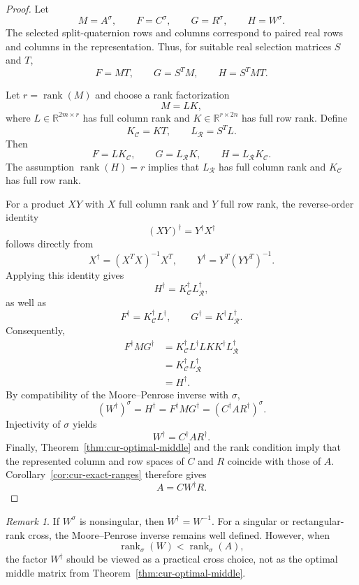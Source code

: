 \documentclass[12pt,a4paper]{article}
\theoremstyle{plain}
\theoremstyle{definition}
\theoremstyle{remark}
\newtheorem{remark}[theorem]{Remark}
\begin{document}
\begin{proof}
Let
\[
    M=A^\sigma, \qquad F=C^\sigma, \qquad G=R^\sigma, \qquad H=W^\sigma.
\]
The selected split-quaternion rows and columns correspond to paired real rows and columns in the representation.  Thus, for suitable real selection matrices \(S\) and \(T\),
\[
    F=MT,\qquad G=S^T M,\qquad H=S^TMT.
\]

Let \(r=\operatorname{rank}(M)\) and choose a rank factorization
\[
    M=LK,
\]
where \(L\in\mathbb{R}^{2m\times r}\) has full column rank and \(K\in\mathbb{R}^{r\times 2n}\) has full row rank.  Define
\[
    K_{\mathcal C}=KT, \qquad L_{\mathcal R}=S^TL.
\]
Then
\[
    F=LK_{\mathcal C}, \qquad G=L_{\mathcal R}K, \qquad H=L_{\mathcal R}K_{\mathcal C}.
\]
The assumption \(\operatorname{rank}(H)=r\) implies that \(L_{\mathcal R}\) has full column rank and \(K_{\mathcal C}\) has full row rank.

For a product \(XY\) with \(X\) full column rank and \(Y\) full row rank, the reverse-order identity
\[
    (XY)^\dagger=Y^\dagger X^\dagger
\]
follows directly from
\[
    X^\dagger=(X^TX)^{-1}X^T, \qquad Y^\dagger=Y^T(YY^T)^{-1}.
\]
Applying this identity gives
\[
    H^\dagger = K_{\mathcal C}^\dagger L_{\mathcal R}^\dagger,
\]
as well as
\[
    F^\dagger=K_{\mathcal C}^\dagger L^\dagger, \qquad G^\dagger=K^\dagger L_{\mathcal R}^\dagger.
\]
Consequently,
\[
\begin{aligned}
    F^\dagger M G^\dagger
    &= K_{\mathcal C}^\dagger L^\dagger L K K^\dagger L_{\mathcal R}^\dagger\\
    &= K_{\mathcal C}^\dagger L_{\mathcal R}^\dagger\\
    &= H^\dagger.
\end{aligned}
\]
By compatibility of the Moore--Penrose inverse with \(\sigma\),
\[
    (W^\dagger)^\sigma = H^\dagger = F^\dagger M G^\dagger = (C^\dagger A R^\dagger)^\sigma.
\]
Injectivity of \(\sigma\) yields
\[
    W^\dagger=C^\dagger A R^\dagger.
\]
Finally, Theorem~\ref{thm:cur-optimal-middle} and the rank condition imply that the represented column and row spaces of \(C\) and \(R\) coincide with those of \(A\).  Corollary~\ref{cor:cur-exact-ranges} therefore gives
\[
    A=CW^\dagger R.
\]
\end{proof}

\begin{remark}
If \(W^\sigma\) is nonsingular, then \(W^\dagger=W^{-1}\).  For a singular or rectangular-rank cross, the Moore--Penrose inverse remains well defined. However, when
\[
    \operatorname{rank}_{\sigma}(W) < \operatorname{rank}_{\sigma}(A),
\]
the factor \(W^\dagger\) should be viewed as a practical cross choice, not as the optimal middle matrix from Theorem~\ref{thm:cur-optimal-middle}.
\end{remark}
\end{document}
